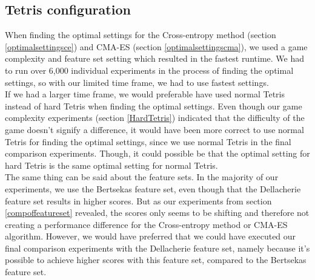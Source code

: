 \subsection{Tetris configuration}

When finding the optimal settings for the Cross-entropy method (section \ref{optimalsettingsce})
and CMA-ES (section \ref{optimalsettingscma}), we used a game complexity and feature set 
setting which resulted in the fastest runtime. We had to run over 6,000 individual experiments
in the process of finding the optimal settings, so with our limited time frame, we had
to use fastest settings.\\
If we had a larger time frame, we would preferable have used normal Tetris instead
of hard Tetris when finding the optimal settings. Even though our game complexity experiments
(section \ref{HardTetris}) indicated that the difficulty of the game doesn't signify a difference, it would have been more correct to use normal Tetris for finding the optimal settings, since
we use normal Tetris in the final comparison experiments. Though, it could possible be that the
optimal setting for hard Tetris is the same optimal setting for normal Tetris.\\
The same thing can be said about the feature sets. In the majority of our experiments, we
use the Bertsekas feature set, even though that the Dellacherie feature set results in
higher scores. But as our experiments from section \ref{compoffeatureset} revealed, the
scores only seems to be shifting and therefore not creating a performance difference for
the Cross-entropy method or CMA-ES algorithm. However, we would have preferred that we could have
executed our final comparison experiments with the Dellacherie feature set, namely because
it's possible to achieve higher scores with this feature set, compared to the Bertsekas feature
set.

